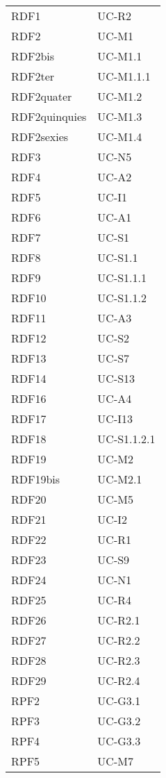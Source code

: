 \begin{longtable}{| p{5cm} | p{5cm} |}
		RDF1 & UC-R2\\
		RDF2 & UC-M1\\
		RDF2bis & UC-M1.1 \\
		RDF2ter & UC-M1.1.1 \\
		RDF2quater & UC-M1.2 \\
		RDF2quinquies & UC-M1.3 \\
		RDF2sexies & UC-M1.4 \\
		\rowcolor{LightGray}
		RDF3 & UC-N5\\
		RDF4 & UC-A2\\
		\rowcolor{LightGray}
		RDF5 & UC-I1\\
		RDF6 & UC-A1\\
		\rowcolor{LightGray}
		RDF7 & UC-S1\\
		RDF8 & UC-S1.1\\
		\rowcolor{LightGray}
		RDF9 & UC-S1.1.1\\
		RDF10 & UC-S1.1.2\\
		\rowcolor{LightGray}
		RDF11 & UC-A3\\
		RDF12 & UC-S2\\
		\rowcolor{LightGray}
		RDF13 & UC-S7\\
		RDF14 & UC-S13\\
		\rowcolor{LightGray}
		RDF16 & UC-A4\\
		RDF17 & UC-I13 \\
		\rowcolor{LightGray}
		RDF18 & UC-S1.1.2.1 \\
		RDF19 & UC-M2 \\
		RDF19bis & UC-M2.1 \\
		\rowcolor{LightGray}
		RDF20 & UC-M5 \\
		RDF21 & UC-I2 \\
		\rowcolor{LightGray}
		RDF22 & UC-R1 \\
		RDF23 & UC-S9 \\
		\rowcolor{LightGray}
		RDF24 & UC-N1\\
		RDF25 & UC-R4\\
		\rowcolor{LightGray}
		RDF26 & UC-R2.1\\
		RDF27 & UC-R2.2\\
		\rowcolor{LightGray}
		RDF28 & UC-R2.3\\
		RDF29 & UC-R2.4\\
		\rowcolor{LightGray}
		RPF2 & UC-G3.1\\
		\rowcolor{LightGray}
		RPF3 & UC-G3.2\\
		RPF4 & UC-G3.3\\
		\rowcolor{LightGray}
		RPF5 & UC-M7\\

\end{longtable}
